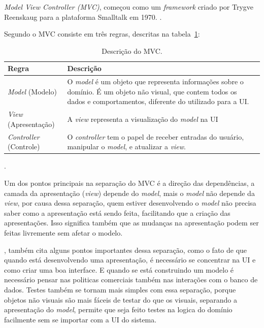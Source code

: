 \textit{Model View Controller (MVC)}, começou como um \textit{framework} criado por Trygve Reenskaug para a plataforma Smalltalk em 1970. \cite[p.~321]{martin_fowler_patterns}.

Segundo  o \ac{MVC} consiste em três regras, descritas na tabela~\ref{tbl:mvc}:

\begin{table}[htdp]
    \begin{center}
        \begin{tabular}{|l|p{10cm}|}
            \hline \textbf{Regra} & \textbf{Descrição} \\
            \hline \textit{Model} (Modelo) & 
            O \textit{model} é um objeto que representa informações sobre o domínio. É um objeto não visual, que contem todos os dados e comportamentos, diferente do utilizado para a UI. \\
            \hline \textit{View} (Apresentação) & 
            A \textit{view} representa a visualização do \textit{model} na \ac{UI} \\
            \hline \textit{Controller} (Controle) & 
            O \textit{controller} tem o papel de receber entradas do usuário, manipular o \textit{model}, e atualizar a \textit{view}. \\
            \hline
        \end{tabular}
        \caption{Descrição do \ac{MVC}.}.
        \label{tbl:mvc}
    \end{center}
\end{table}

Um dos pontos principais na separação do \ac{MVC} é a direção das dependências, a camada da apresentação (\textit{view}) depende do \textit{model}, mais o \textit{model} não depende da \textit{view}, por causa dessa separação, quem estiver desenvolvendo o \textit{model} não precisa saber como a apresentação está sendo feita, facilitando que a criação das apresentações. Isso significa também que as mudanças na apresentação podem ser feitas livremente sem afetar o modelo.

, também cita alguns pontos importantes dessa separação, como o fato de que quando está desenvolvendo uma apresentação, é necessário se concentrar na \ac{UI} e como criar uma boa interface. E quando se está construindo um modelo é necessário pensar nas politicas comerciais também nas interações com o banco de dados. Testes também se tornam mais simples com essa separação, porque objetos não visuais são mais fáceis de testar do que os visuais, separando a apresentação do \textit{model}, permite que seja feito testes na logica do domínio facilmente sem se importar com a \ac{UI} do sistema.
